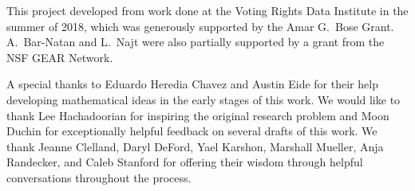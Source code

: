 
This project developed from work done at the Voting Rights Data Institute in the summer of 2018, which was generously supported by the Amar G.\ Bose Grant.  A.\ Bar-Natan and L.\ Najt were also partially supported by a grant from the NSF GEAR Network.

A special thanks to Eduardo Heredia Chavez and Austin Eide for their help developing mathematical ideas in the early stages of this work. We would like to thank Lee Hachadoorian for inspiring the original research problem and Moon Duchin for exceptionally helpful feedback on several drafts of this work.  We thank Jeanne Clelland, Daryl DeFord, Yael Karshon, Marshall Mueller, Anja Randecker, and Caleb Stanford for offering their wisdom through helpful conversations throughout the process.
